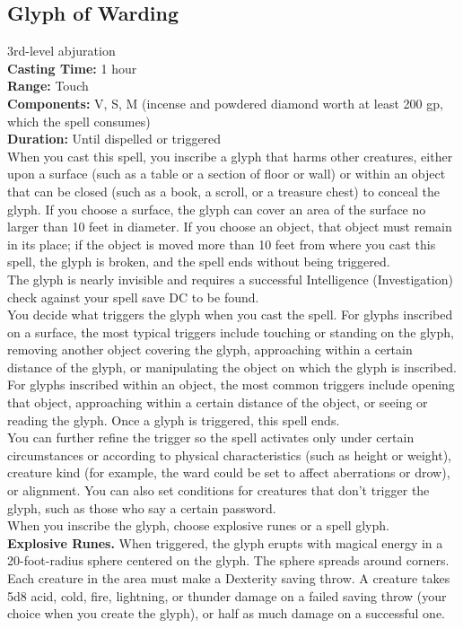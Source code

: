 \documentclass[11pt, A4paper, english]{article}
\begin{document}
		\subsection{Glyph of Warding}
3rd-level abjuration \\
\textbf{Casting Time:} 1 hour \\
\textbf{Range:} Touch \\
\textbf{Components:} V, S, M (incense and powdered diamond worth at least 200 gp, which the spell consumes) \\
\textbf{Duration:} Until dispelled or triggered \\
When you cast this spell, you inscribe a glyph that harms other creatures, either upon a surface (such as a table or a section of floor or wall) or within an object that can be closed (such as a book, a scroll, or a treasure chest) to conceal the glyph. If you choose a surface, the glyph can cover an area of the surface no larger than 10 feet in diameter. If you choose an object, that object must remain in its place; if the object is moved more than 10 feet from where you cast this spell, the glyph is broken, and the spell ends without being triggered. \\
The glyph is nearly invisible and requires a successful Intelligence (Investigation) check against your spell save DC to be found. \\
You decide what triggers the glyph when you cast the spell. For glyphs inscribed on a surface, the most typical triggers include touching or standing on the glyph, removing another object covering the glyph, approaching within a certain distance of the glyph, or manipulating the object on which the glyph is inscribed. For glyphs inscribed within an object, the most common triggers include opening that object, approaching within a certain distance of the object, or seeing or reading the glyph. Once a glyph is triggered, this spell ends. \\
You can further refine the trigger so the spell activates only under certain circumstances or according to physical characteristics (such as height or weight), creature kind (for example, the ward could be set to affect aberrations or drow), or alignment. You can also set conditions for creatures that don’t trigger the glyph, such as those who say a certain password. \\
When you inscribe the glyph, choose explosive runes or a spell glyph. \\
\textbf{Explosive Runes.} When triggered, the glyph erupts with magical energy in a 20-foot-radius sphere centered on the glyph. The sphere spreads around corners. Each creature in the area must make a Dexterity saving throw. A creature takes 5d8 acid, cold, fire, lightning, or thunder damage on a failed saving throw (your choice when you create the glyph), or half as much damage on a successful one. \\
\end{document}
